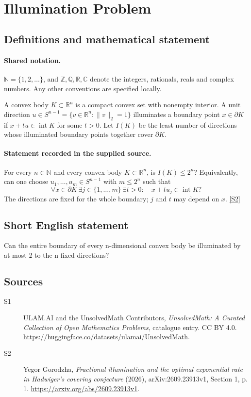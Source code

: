 \documentclass[11pt]{article}
\newcommand{\sref}[2]{\hyperlink{source:#1:#2}{[S#2]}}
\begin{document}
\section{Illumination Problem}\label{statement}

\subsection{Definitions and mathematical statement}

\paragraph{Shared notation.}$\mathbb N=\{1,2,\ldots\}$, and $\mathbb Z,\mathbb Q,\mathbb R,\mathbb C$ denote the integers, rationals, reals and complex numbers. Any other conventions are specified locally.


A convex body $K\subset\mathbb R^n$ is a compact convex set with nonempty interior. A unit direction $u\in S^{n-1}=\{v\in\mathbb R^n:\|v\|_2=1\}$ illuminates a boundary point $x\in\partial K$ if $x+tu\in\operatorname{int}K$ for some $t>0$. Let $I(K)$ be the least number of directions whose illuminated boundary points together cover $\partial K$.
\paragraph{Statement recorded in the supplied source.}
For every $n\in\mathbb N$ and every convex body $K\subset\mathbb R^n$, is $I(K)\le 2^n$? Equivalently, can one choose $u_1,\ldots,u_m\in S^{n-1}$ with $m\le2^n$ such that
\[
 \forall x\in\partial K\ \exists j\in\{1,\ldots,m\}\ \exists t>0:\quad x+tu_j\in\operatorname{int}K?
\]
The directions are fixed for the whole boundary; $j$ and $t$ may depend on $x$. \sref{statement}{2}
\subsection{Short English statement}
Can the entire boundary of every n-dimensional convex body be illuminated by at most 2 to the n fixed directions?
\subsection{Sources}
\begin{description}
\item[\hypertarget{source:statement:1}{S1}] ULAM.AI and the UnsolvedMath Contributors, \emph{UnsolvedMath: A Curated Collection of Open Mathematics Problems}, catalogue entry. CC BY 4.0. \url{https://huggingface.co/datasets/ulamai/UnsolvedMath}.
\item[\hypertarget{source:statement:2}{S2}] Yegor Gorodzha, \emph{Fractional illumination and the optimal exponential rate in Hadwiger's covering conjecture} (2026), arXiv:2609.23913v1, Section 1, p. 1. \url{https://arxiv.org/abs/2609.23913v1}.
\end{description}
\label{end:statement}
\end{document}
